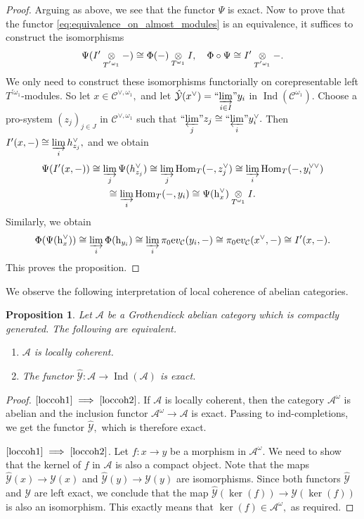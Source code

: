 \documentclass[11pt,leqno]{amsart}
\newcommand{\Implies}[2]{$\text{\ref{#1}}\implies\text{\ref{#2}}$}
\newtheorem{prop}[theo]{Proposition}
\numberwithin{equation}{section}
\def\h{\operatorname{h}}
\def\Hom{\operatorname{Hom}}
\newcommand{\tens}[1]{%
  \mathbin{\mathop{\otimes}\displaylimits_{#1}}%
}
\newcommand{\indlim}[1][]{\mathop{\varinjlim}\limits_{#1}}
\newcommand{\inddlim}[1][]{{``{\indlim[#1]}"}}
\newcommand{\prolim}[1][]{\mathop{\varprojlim}\limits_{#1}}
\newcommand{\proolim}[1][]{{``{\prolim[#1]}"}}
\newcommand{\ev}{\mathrm ev}
\newcommand{\cA}{{\mathcal A}}
\newcommand{\cC}{{\mathcal C}}
\newcommand{\cY}{{\mathcal Y}}
\newcommand{\Ind}{\operatorname{Ind}}
\begin{document}
\begin{proof}
Arguing as above, we see that the functor $\Psi$ is exact. Now to prove that the functor \eqref{eq:equivalence_on_almost_modules} is an equivalence, it suffices to construct the isomorphisms
\begin{equation*}
\Psi(I'\tens{T^{'\omega_1}}-)\cong \Phi(-)\tens{T^{\omega_1}}I,\quad \Phi\circ\Psi\cong I'\tens{T^{'\omega_1}}-.
\end{equation*}
We only need to construct these isomorphisms functorially on corepresentable left $T^{'\omega_1}$-modules. So let $x\in \cC^{\vee,\omega_1},$ and let $\hat{\cY}(x^{\vee})=\inddlim[i\in I]y_i$ in $\Ind(\cC^{\omega_1}).$ Choose a pro-system $(z_j)_{j\in J}$ in $\cC^{\vee,\omega_1}$ such that $\proolim[j]z_j\cong\proolim[i]y_i^{\vee}.$ Then $I'(x,-)\cong\indlim[i]h_{z_j}^{\vee},$ and we obtain
\begin{multline*}
\Psi(I'(x,-))\cong\indlim[j]\Psi(h_{z_j}^{\vee})\cong\indlim[j]\Hom_T(-,z_j^{\vee})\cong\indlim[i]\Hom_T(-,y_i^{\vee\vee})\\
\cong\indlim[i]\Hom_T(-,y_i)\cong \Psi(\h_x^{\vee})\tens{T^{\omega_1}}I.
\end{multline*}
Similarly, we obtain
\begin{equation*}
\Phi(\Psi(\h_x^{\vee}))\cong\indlim[i]\Phi(\h_{y_i})\cong \indlim[i]\pi_0\ev_{\cC}(y_i,-)\cong\pi_0\ev_{\cC}(x^{\vee},-)\cong I'(x,-).
\end{equation*}
This proves the proposition.
\end{proof}


 We observe the following interpretation of local coherence of abelian categories.

\begin{prop}\label{prop:local_coherence} Let $\cA$ be a Grothendieck abelian category which is compactly generated. The following are equivalent.
\begin{enumerate}[label=(\roman*),ref=(\roman*)]
\item $\cA$ is locally coherent. \label{loccoh1}

\item The functor $\hat{\cY}:\cA\to\Ind(\cA)$ is exact. \label{loccoh2}
\end{enumerate}
\end{prop}

\begin{proof}\Implies{loccoh1}{loccoh2}. If $\cA$ is locally coherent, then the category $\cA^{\omega}$ is abelian and the inclusion functor $\cA^{\omega}\to\cA$ is exact. Passing to ind-completions, we get the functor $\hat{\cY},$ which is therefore exact.

\Implies{loccoh1}{loccoh2}. Let $f:x\to y$ be a morphism in $\cA^{\omega}.$ We need to show that the kernel of $f$ in $\cA$ is also a compact object. Note that the maps $\hat{\cY}(x)\to \cY(x)$ and $\hat{\cY}(y)\to \cY(y)$ are isomorphisms. Since both functors $\hat{\cY}$ and $\cY$ are left exact, we conclude that the map $\hat{\cY}(\ker(f))\to \cY(\ker(f))$ is also an isomorphism. This exactly means that $\ker(f)\in\cA^{\omega},$ as required.\end{proof}
\end{document}

